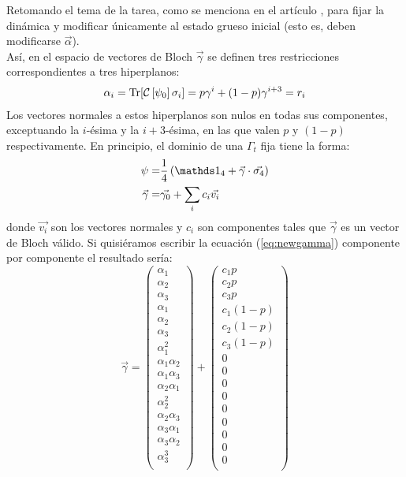 Retomando el tema de la tarea, como se menciona en el artículo \cite{CGEmergingDynamics}, para fijar la dinámica y modificar únicamente al estado grueso inicial (esto es, deben modificarse $\vec{\alpha}$).\\
Así, en el espacio de vectores de Bloch $\vec{\gamma}$ se definen tres restricciones correspondientes a tres hiperplanos:
\begin{align}
\alpha_{i}=\Tr[\mathcal{C}\left[\psi_{0}\right]\sigma_{i}]=p\gamma^{i}+(1-p)\gamma^{i+3}=r_{i}
\end{align}
Los vectores normales a estos hiperplanos son nulos en todas sus componentes, exceptuando la $i$-ésima y la $i+3$-ésima, en las que valen $p$ y $(1-p)$ respectivamente. En principio, el dominio de una $\Gamma_{t}$ fija tiene la forma:
\begin{align}
\psi=&\frac{1}{4}\left( \Id_{4}+\vec{\gamma}\cdot\vec{\sigma_{4}} \right)\\
\vec{\gamma}=&\vec{\gamma_{0}}+\sum_{i}c_{i}\vec{v_{i}}\label{eq:newgamma}
\end{align}
donde $\vec{v_{i}}$ son los vectores normales y $c_{i}$ son componentes tales que $\vec{\gamma}$ es un vector de Bloch válido. Si quisiéramos escribir la ecuación (\ref{eq:newgamma})  componente por componente el resultado sería:
\begin{equation}
\vec{\gamma}=\begin{pmatrix}
\alpha_{1}\\
\alpha_{2}\\
\alpha_{3}\\
\alpha_{1}\\
\alpha_{2}\\
\alpha_{3}\\
\alpha_{1}^{2}\\
\alpha_{1}\alpha_{2}\\
\alpha_{1}\alpha_{3}\\
\alpha_{2}\alpha_{1}\\
\alpha_{2}^{2}\\
\alpha_{2}\alpha_{3}\\
\alpha_{3}\alpha_{1}\\
\alpha_{3}\alpha_{2}\\
\alpha_{3}^{3}\\
\end{pmatrix}+\begin{pmatrix}
c_{1}p\\
c_{2}p\\
c_{3}p\\
c_{1}(1-p)\\
c_{2}(1-p)\\
c_{3}(1-p)\\
0\\
0\\
0\\
0\\
0\\
0\\
0\\
0\\
0\\
\end{pmatrix}\label{eq:newvec}
\end{equation}

